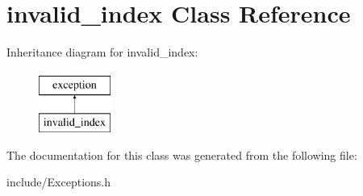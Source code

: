 \hypertarget{classinvalid__index}{}\section{invalid\+\_\+index Class Reference}
\label{classinvalid__index}
Inheritance diagram for invalid\+\_\+index\+:\begin{figure}[H]
\begin{center}
\leavevmode
\includegraphics[height=2.000000cm]{classinvalid__index}
\end{center}
\end{figure}


The documentation for this class was generated from the following file\+:\begin{DoxyCompactItemize}
\item 
include/Exceptions.\+h\end{DoxyCompactItemize}
